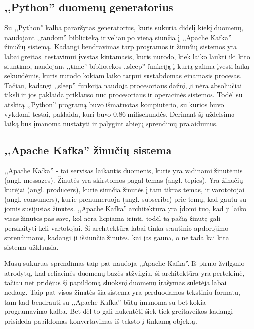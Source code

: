 \documentclass{VUMIFPSkursinis}
\begin{document}
\subsection{,,Python'' duomenų generatorius}

Su ,,Python'' kalba pararšytas generatorius, kuris sukuria didelį kiekį duomenų, naudojant ,,random'' biblioteką ir veliau po vieną siunčia į 
,,Apache Kafka'' žinučių sistemą. Kadangi bendravimas tarp programos ir žinučių sistemos yra labai greitas, testavimui įvestas kintamasis, kuris
nurodo, kiek laiko laukti iki kito siuntimo, naudojant ,,time'' bibliotekos ,,sleep'' funkciją į kurią galima įvesti laiką sekundėmis, kuris
nurodo kokiam laiko tarpui sustabdomas einamasis procesas. Tačiau, kadangi ,,sleep'' funkcija naudoja procesoriaus dažnį, ji nėra absoliučiai tiksli
ir jos paklaida priklauso nuo procesoriaus ir operacinės sistemos\cite{imtiaz20}. Todėl su atskirą ,,Python'' programą buvo išmatuotas kompiuterio,
su kurios buvo vykdomi testai, paklaida, kuri buvo 0.86 milisekundės. Derinant šį uždelsimo laiką bus įmanoma nustatyti ir palygint abiejų sprendimų pralaidumus.

\subsection{,,Apache Kafka'' žinučių sistema}

,,Apache Kafka'' - tai servisas laikantis duomenis, kurie yra vadinami žinutėmis (angl. messages). Žinutės yra skirstomos pagal temas (angl. topics).
Yra žinučių kurėjai (angl. producers), kurie siunčia žinutės į tam tikras temas, ir varototojai (angl. consumers), kurie prenumeruoja (angl. subscribe)
prie temų, kad gautu su jomis susijusias žinutes\cite{thein2014apache}. ,,Apache Kafka'' architektūra yra įdomi tuo, kad ji laiko visas žinutes pas save, kol nėra liepiama 
trinti, todėl tą pačią žinutę gali perskaityti keli vartotojai. Ši architektūra labai tinka srautinio apdorojimo sprendimams, kadangi ji išsiunčia žinutes,
kai jas gauna, o ne tada kai kita sistema užklausia. \par 
Mūsų sukurtas sprendimas taip pat naudoja ,,Apache Kafka''. Iš pirmo žvilgsnio atrodytų, 
kad reliacinės duomenų bazės atžvilgiu, ši architektūra yra perteklinė, tačiau net pridėjus šį papildomą sluoksnį duomenų įrašymas suletėja labai nedaug.
Taip pat visos žinutės šia sistema yra perduodamos tekstiniu formatu, tam kad bendrauti su ,,Apache Kafka'' būtų įmanoma su bet kokia programavimo kalba.
Bet dėl to gali nukentėti šiek tiek greitaveikos kadangi prisideda papildomas konvertavimas iš teksto į tinkamą objektą.
\end{document}
